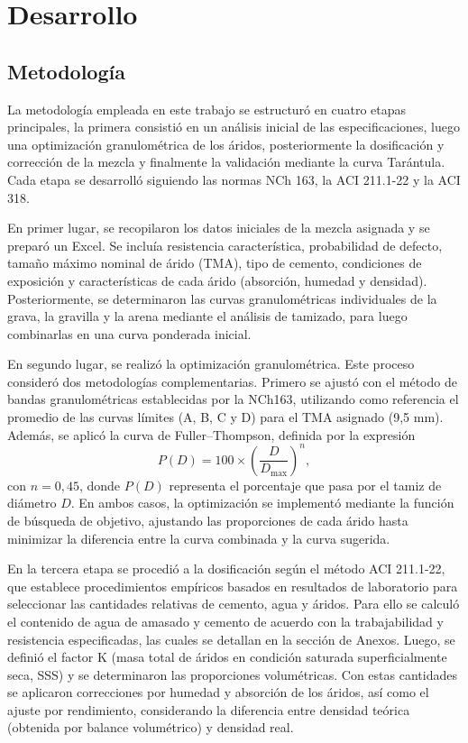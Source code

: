 \section{Desarrollo}

\subsection{Metodología}

La metodología empleada en este trabajo se estructuró en cuatro etapas principales, la primera consistió en un análisis inicial de las especificaciones, luego una optimización granulométrica de los áridos, posteriormente la dosificación y corrección de la mezcla y finalmente la validación mediante la curva Tarántula. Cada etapa se desarrolló siguiendo las normas NCh 163, la ACI 211.1-22 y la ACI 318.

En primer lugar, se recopilaron los datos iniciales de la mezcla asignada y se preparó un Excel. Se incluía resistencia característica, probabilidad de defecto, tamaño máximo nominal de árido (TMA), tipo de cemento, condiciones de exposición y características de cada árido (absorción, humedad y densidad). Posteriormente, se determinaron las curvas granulométricas individuales de la grava, la gravilla y la arena mediante el análisis de tamizado, para luego combinarlas en una curva ponderada inicial.

En segundo lugar, se realizó la optimización granulométrica. Este proceso consideró dos metodologías complementarias. Primero se ajustó con el método de bandas granulométricas establecidas por la NCh163, utilizando como referencia el promedio de las curvas límites (A, B, C y D) para el TMA asignado (9,5 mm). Además, se aplicó la curva de Fuller–Thompson, definida por la expresión
\[
P(D) = 100 \times \left( \frac{D}{D_{\text{max}}} \right)^n,
\]
con $n = 0,45$, donde $P(D)$ representa el porcentaje que pasa por el tamiz de diámetro $D$. En ambos casos, la optimización se implementó mediante la función de búsqueda de objetivo, ajustando las proporciones de cada árido hasta minimizar la diferencia entre la curva combinada y la curva sugerida.

En la tercera etapa se procedió a la dosificación según el método ACI 211.1-22, que establece procedimientos empíricos basados en resultados de laboratorio para seleccionar las cantidades relativas de cemento, agua y áridos. Para ello se calculó el contenido de agua de amasado y cemento de acuerdo con la trabajabilidad y resistencia especificadas, las cuales se detallan en la sección de Anexos. Luego, se definió el factor K (masa total de áridos en condición saturada superficialmente seca, SSS) y se determinaron las proporciones volumétricas. Con estas cantidades se aplicaron correcciones por humedad y absorción de los áridos, así como el ajuste por rendimiento, considerando la diferencia entre densidad teórica (obtenida por balance volumétrico) y densidad real.

